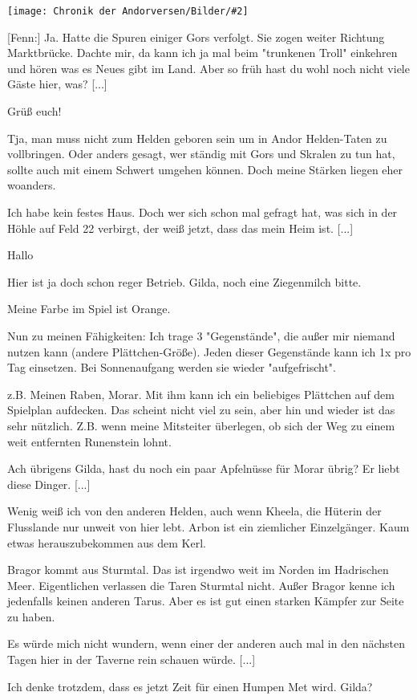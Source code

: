 \documentclass[10pt, a4paper, oneside]{book}
\newcommand{\bildmitts}[2][height=0.32\textwidth,width=0.48\textwidth,keepaspectratio]{%
    \begin{center}
        \texttt{[image: Chronik der Andorversen/Bilder/\#2]}
    \end{center}
}
\begin{document}
\begin{multicols}{2}
\bildmitts{NH Taverne Bild 1.jpg}

[Fenn:] Ja. Hatte die Spuren einiger Gors verfolgt. Sie zogen weiter Richtung Marktbrücke. Dachte mir, da kann ich ja mal beim "trunkenen Troll" einkehren und hören was es Neues gibt im Land. Aber so früh hast du wohl noch nicht viele Gäste hier, was? [...]

Grüß euch!

Tja, man muss nicht zum Helden geboren sein um in Andor Helden-Taten zu vollbringen. Oder anders gesagt, wer ständig mit Gors und Skralen zu tun hat, sollte auch mit einem Schwert umgehen können. Doch meine Stärken liegen eher woanders.

Ich habe kein festes Haus. Doch wer sich schon mal gefragt hat, was sich in der Höhle auf Feld 22 verbirgt, der weiß jetzt, dass das mein Heim ist. [...]

Hallo

Hier ist ja doch schon reger Betrieb. Gilda, noch eine Ziegenmilch bitte.

Meine Farbe im Spiel ist Orange.

Nun zu meinen Fähigkeiten: Ich trage 3 "Gegenstände", die außer mir niemand nutzen kann (andere Plättchen-Größe). Jeden dieser Gegenstände kann ich 1x pro Tag einsetzen. Bei Sonnenaufgang werden sie wieder "aufgefrischt".

z.B. Meinen Raben, Morar. Mit ihm kann ich ein beliebiges Plättchen auf dem Spielplan aufdecken. Das scheint nicht viel zu sein, aber hin und wieder ist das sehr nützlich. Z.B. wenn meine Mitsteiter überlegen, ob sich der Weg zu einem weit entfernten Runenstein lohnt.

Ach übrigens Gilda, hast du noch ein paar Apfelnüsse für Morar übrig? Er liebt diese Dinger. [...]

Wenig weiß ich von den anderen Helden, auch wenn Kheela, die Hüterin der Flusslande nur unweit von hier lebt. Arbon ist ein ziemlicher Einzelgänger. Kaum etwas herauszubekommen aus dem Kerl.

Bragor kommt aus Sturmtal. Das ist irgendwo weit im Norden im Hadrischen Meer. Eigentlichen verlassen die Taren Sturmtal nicht. Außer Bragor kenne ich jedenfalls keinen anderen Tarus. Aber es ist gut einen starken Kämpfer zur Seite zu haben.

Es würde mich nicht wundern, wenn einer der anderen auch mal in den nächsten Tagen hier in der Taverne rein schauen würde. [...]

Ich denke trotzdem, dass es jetzt Zeit für einen Humpen Met wird. Gilda?


\end{multicols}
\end{document}
